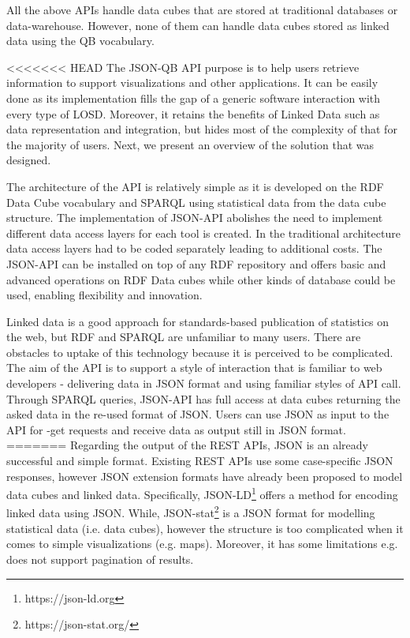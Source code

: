 \documentclass{llncs}
\begin{document}
All the above APIs handle data cubes that are stored at traditional databases or data-warehouse. However, none of them can handle data cubes  stored as linked data using the QB vocabulary.  

<<<<<<< HEAD
The JSON-QB API purpose is to help users retrieve information to support visualizations and other applications. It can be easily done as its implementation fills the gap of a generic software interaction with every type of LOSD. Moreover, it retains the benefits of Linked Data such as data representation and integration, but hides most of the complexity of that for the majority of users. Next, we present an overview of the solution that was designed.

The architecture of the API is relatively simple as it is developed on the RDF Data Cube vocabulary and SPARQL using statistical data from the data cube structure. The implementation of JSON-API abolishes the need to implement different data access layers for each tool is created. In the traditional architecture data access layers had to be coded separately leading to additional costs. The JSON-API can be installed on top of any RDF repository and offers basic and advanced operations on RDF Data cubes while other kinds of database could be used, enabling flexibility and innovation.

Linked data is a good approach for standards-based publication of statistics on the web, but RDF and SPARQL are unfamiliar to many users. There are obstacles to uptake of this technology because it is perceived to be complicated. The aim of the API is to support a style of interaction that is familiar to web developers - delivering data in JSON format and using familiar styles of API call. Through SPARQL queries, JSON-API has full access at data cubes returning the asked data in the re-used format of JSON. Users can use JSON as input to the API for -get requests and receive data as output still in JSON format.
=======
Regarding the output of the REST APIs, JSON is an already successful and simple format. Existing REST APIs use some case-specific JSON responses, however JSON extension formats have already been proposed to model data cubes and linked data. Specifically, JSON-LD\footnote{https://json-ld.org} offers a method for encoding linked data using JSON. While, JSON-stat\footnote{https://json-stat.org/} is a JSON format for modelling statistical data (i.e. data cubes), however the structure is too complicated when it comes to simple visualizations (e.g. maps). Moreover, it has some limitations e.g. does not support pagination of results. 
\end{document}
